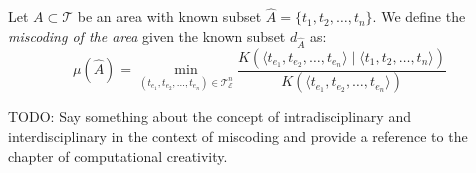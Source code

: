 \begin{definition}
Let $A \subset \mathcal{T}$ be an area with known subset $\hat{A} = \{t_1, t_2, \ldots, t_n\}$. We define the \emph{miscoding of the area} given the known subset $d_{\hat{A}}$ as:
\[
\mu(\hat{A}) = \min_{(t_{e_1}, t_{e_2}, \ldots, t_{e_n}) \in \mathcal{T}_\mathcal{E}^n}  \frac{K \left( \langle t_{e_1}, t_{e_2}, \ldots, t_{e_n} \rangle \mid \langle t_1, t_2, \ldots, t_n \rangle \right) }{K \left( \langle t_{e_1}, t_{e_2}, \ldots, t_{e_n} \rangle \right)}
\]
\end{definition}

{\color{red} TODO: Say something about the concept of intradisciplinary and interdisciplinary in the context of miscoding and provide a reference to the chapter of computational creativity.}
